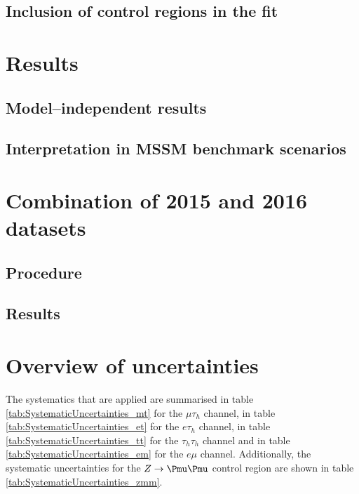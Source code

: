 \subsection{Inclusion of control regions in the fit}
\label{sec:mssm_sigext_ctrl}

\section{Results}
\label{sec:mssm_results}

\subsection{Model--independent results}
\label{sec:mssm_results_modelindep}

\subsection{Interpretation in MSSM benchmark scenarios}
\label{sec:mssm_results_modeldep}

\section{Combination of 2015 and 2016 datasets}
\label{sec:mssm_combination}

\subsection{Procedure}
\label{sec:mssm_combination_procedure}

\subsection{Results}
\label{sec:mssm_combination_results}

\section{Overview of uncertainties}
\label{sec:mssm_uncs_overview}
The systematics that are applied are summarised in
table \ref{tab:SystematicUncertainties_mt} for the $\mu\tau_h$
channel, in table \ref{tab:SystematicUncertainties_et} for the $e\tau_h$ channel,
in table \ref{tab:SystematicUncertainties_tt} for the $\tau_h\tau_h$ channel and
in table \ref{tab:SystematicUncertainties_em} for the $e\mu$ channel. Additionally,
the systematic uncertainties for the $Z\rightarrow\mumu$ control region are shown
in table \ref{tab:SystematicUncertainties_zmm}.

